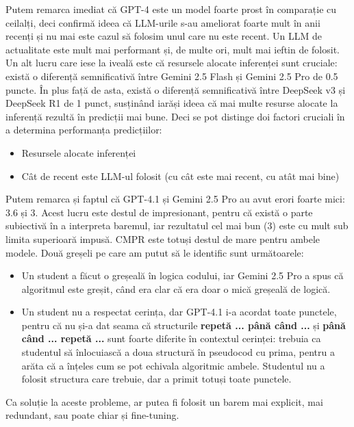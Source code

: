 \documentclass[12pt, a4paper]{report}
\begin{document}
Putem remarca imediat că GPT-4 este un model foarte prost în comparație cu ceilalți, deci confirmă ideea că LLM-urile s-au ameliorat foarte mult în anii recenți  
și nu mai este cazul să folosim unul care nu este recent. Un LLM de actualitate este mult mai performant și, de multe ori, mult mai ieftin de folosit.  
Un alt lucru care iese la iveală este că resursele alocate inferenței sunt cruciale: există o diferență semnificativă între Gemini 2.5 Flash și Gemini 2.5 Pro de 0.5 puncte.  
În plus față de asta, există o diferență semnificativă între DeepSeek v3 și DeepSeek R1 de 1 punct, susținând iarăși ideea că mai multe resurse alocate la inferență rezultă în predicții mai bune.  
Deci se pot distinge doi factori cruciali în a determina performanța predicțiilor:
\begin{itemize}
  \item Resursele alocate inferenței
  \item Cât de recent este LLM-ul folosit (cu cât este mai recent, cu atât mai bine)
\end{itemize}


Putem remarca și faptul că GPT-4.1 și Gemini 2.5 Pro au avut erori foarte mici: 3.6 și 3. Acest lucru este destul de impresionant, pentru că există o parte subiectivă  
în a interpreta baremul, iar rezultatul cel mai bun (3) este cu mult sub limita superioară impusă. CMPR este totuși destul de mare pentru ambele modele.  
Două greșeli pe care am putut să le identific sunt următoarele:
\begin{itemize}
  \item Un student a făcut o greșeală în logica codului, iar Gemini 2.5 Pro a spus că algoritmul este greșit, când era clar că era doar o mică greșeală de logică.
  \item Un student nu a respectat cerința, dar GPT-4.1 i-a acordat toate punctele, pentru că nu și-a dat seama că structurile \textbf{repetă ... până când ...} și \textbf{până când ... repetă ...}  
  sunt foarte diferite în contextul cerinței: trebuia ca studentul să înlocuiască a doua structură în pseudocod cu prima, pentru a arăta că a înțeles cum se pot echivala algoritmic ambele.  
  Studentul nu a folosit structura care trebuie, dar a primit totuși toate punctele.
\end{itemize}

Ca soluție la aceste probleme, ar putea fi folosit un barem mai explicit, mai redundant, sau poate chiar și fine-tuning.
\end{document}
